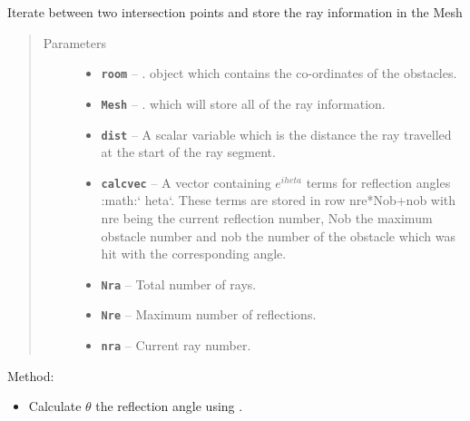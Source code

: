 \documentclass[letterpaper,10pt,english]{sphinxmanual}
\begin{document}
\begin{fulllineitems}
\begin{fulllineitems}
\label{index:Rays.Ray.mesh_singleray}
Iterate between two intersection points and store the ray     information in the Mesh
\begin{quote}\begin{description}
\item[{Parameters}] \leavevmode\begin{itemize}
\item {} 
\textbf{\texttt{room}} -- {\hyperref[index:module\string-Room]{}}.  object which     contains the co-ordinates of the obstacles.

\item {} 
\textbf{\texttt{Mesh}} -- {\hyperref[index:module\string-DictionarySparseMatrix]{}}.      which will store all of the ray information.

\item {} 
\textbf{\texttt{dist}} -- A scalar variable which is the distance the ray     travelled at the start of the ray segment.

\item {} 
\textbf{\texttt{calcvec}} -- A vector containing \(e^{i     heta}\) terms     for reflection angles :math:{}`  heta{}`. These terms are stored     in row nre*Nob+nob with nre being the current reflection number,     Nob the maximum obstacle number and nob the number of the     obstacle which was hit with the corresponding angle.

\item {} 
\textbf{\texttt{Nra}} -- Total number of rays.

\item {} 
\textbf{\texttt{Nre}} -- Maximum number of reflections.

\item {} 
\textbf{\texttt{nra}} -- Current ray number.

\end{itemize}

\end{description}\end{quote}

Method:
\begin{itemize}
\item {} 
Calculate \(\theta\) the reflection angle using     .


\end{itemize}
\end{fulllineitems}
\end{fulllineitems}
\end{document}
